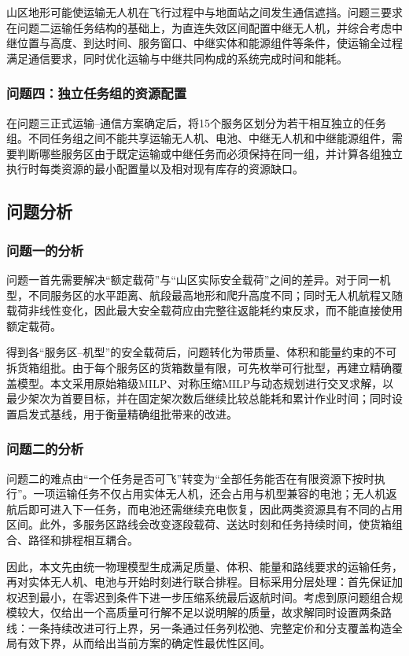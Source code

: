 \documentclass[UTF8,a4paper,12pt]{ctexart}
\begin{document}
山区地形可能使运输无人机在飞行过程中与地面站之间发生通信遮挡。问题三要求在问题二运输任务结构的基础上，为直连失效区间配置中继无人机，并综合考虑中继位置与高度、到达时间、服务窗口、中继实体和能源组件等条件，使运输全过程满足通信要求，同时优化运输与中继共同构成的系统完成时间和能耗。

\subsubsection{问题四：独立任务组的资源配置}

在问题三正式运输--通信方案确定后，将15个服务区划分为若干相互独立的任务组。不同任务组之间不能共享运输无人机、电池、中继无人机和中继能源组件，需要判断哪些服务区由于既定运输或中继任务而必须保持在同一组，并计算各组独立执行时每类资源的最小配置量以及相对现有库存的资源缺口。

\subsection{问题分析}

\subsubsection{问题一的分析}

问题一首先需要解决“额定载荷”与“山区实际安全载荷”之间的差异。对于同一机型，不同服务区的水平距离、航段最高地形和爬升高度不同；同时无人机航程又随载荷非线性变化，因此最大安全载荷应由完整往返能耗约束反求，而不能直接使用额定载荷。

得到各“服务区--机型”的安全载荷后，问题转化为带质量、体积和能量约束的不可拆货箱组批。由于每个服务区的货箱数量有限，可先枚举可行批型，再建立精确覆盖模型。本文采用原始箱级MILP、对称压缩MILP与动态规划进行交叉求解，以最少架次为首要目标，并在固定架次数后继续比较总能耗和累计作业时间；同时设置启发式基线，用于衡量精确组批带来的改进。

\subsubsection{问题二的分析}

问题二的难点由“一个任务是否可飞”转变为“全部任务能否在有限资源下按时执行”。一项运输任务不仅占用实体无人机，还会占用与机型兼容的电池；无人机返航后即可进入下一任务，而电池还需继续充电恢复，因此两类资源具有不同的占用区间。此外，多服务区路线会改变逐段载荷、送达时刻和任务持续时间，使货箱组合、路径和排程相互耦合。

因此，本文先由统一物理模型生成满足质量、体积、能量和路线要求的运输任务，再对实体无人机、电池与开始时刻进行联合排程。目标采用分层处理：首先保证加权迟到最小，在零迟到条件下进一步压缩系统最后返航时间。考虑到原问题组合规模较大，仅给出一个高质量可行解不足以说明解的质量，故求解同时设置两条路线：一条持续改进可行上界，另一条通过任务列松弛、完整定价和分支覆盖构造全局有效下界，从而给出当前方案的确定性最优性区间。
\end{document}
